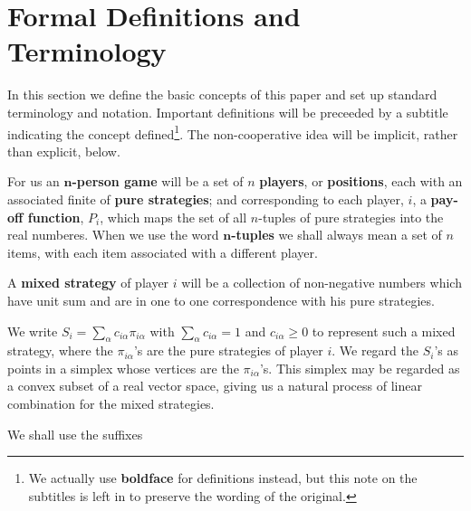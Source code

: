 \section{Formal Definitions and Terminology}
\hspace{\parindent}In this section we define the basic concepts of this paper and set up standard terminology and notation. Important definitions will be preceeded by a subtitle indicating the concept defined\footnote{We actually use \textbf{boldface} for definitions instead, but this note on the subtitles is left in to preserve the wording of the original.}. The non-cooperative idea will be implicit, rather than explicit, below.
\begin{definition}
    For us an $\mathbf n$\textbf{-person game} will be a set of $n$ \textbf{players}, or \textbf{positions}, each with an associated finite of \textbf{pure strategies}; and corresponding to each player, $i$, a \textbf{pay-off function}, $P_i $, which maps the set of all $n$-tuples of pure strategies into the real numberes. When we use the word $\mathbf n$\textbf{-tuples} we shall always mean a set of $n$ items, with each item associated with a different player.
\end{definition}
\begin{definition}
   A \textbf{mixed strategy} of player $i$ will be a collection of non-negative numbers which have unit sum and are in one to one correspondence with his pure strategies.
\end{definition}
   We write $S_i=\sum_{\alpha }^{} c_{i\alpha }\pi_{i\alpha } $ with $\sum_{\alpha }^{} c_{i\alpha }=1 $ and $c_{i\alpha }\geq 0$ to represent such a mixed strategy, where the $\pi_{i\alpha }$'s are the pure strategies of player $i$. We regard the $S_i $'s as points in a simplex whose vertices are the $\pi_{i\alpha }$'s. This simplex may be regarded as a convex subset of a real vector space, giving us a natural process of linear combination for the mixed strategies.

   We shall use the suffixes 
